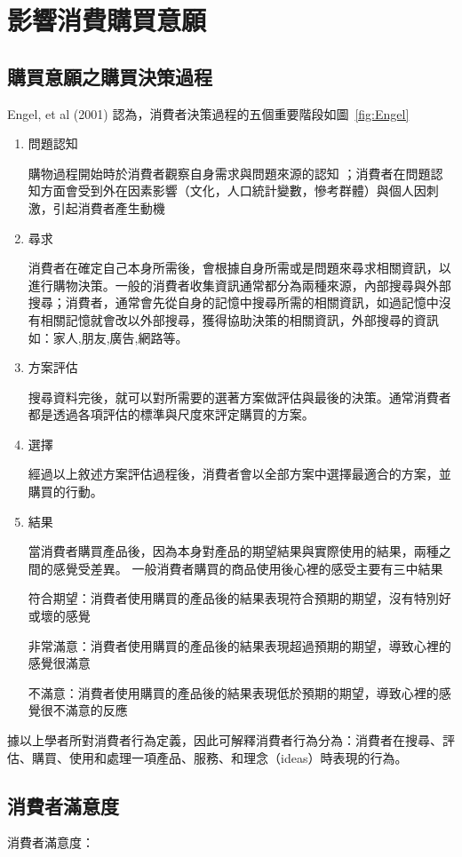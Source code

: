 \section{影響消費購買意願}
\subsection{購買意願之購買決策過程}
Engel, et al (2001) 認為，消費者決策過程的五個重要階段如圖~\ref{fig:Engel}
\begin{enumerate}
\item 問題認知

購物過程開始時於消費者觀察自身需求與問題來源的認知 ；消費者在問題認知方面會受到外在因素影響（文化，人口統計變數，慘考群體）與個人因刺激，引起消費者產生動機

\item 尋求

消費者在確定自己本身所需後，會根據自身所需或是問題來尋求相關資訊，以進行購物決策。一般的消費者收集資訊通常都分為兩種來源，內部搜尋與外部搜尋；消費者，通常會先從自身的記憶中搜尋所需的相關資訊，如過記憶中沒有相關記憶就會改以外部搜尋，獲得協助決策的相關資訊，外部搜尋的資訊如：家人,朋友,廣告,網路等。
           
\item 方案評估

搜尋資料完後，就可以對所需要的選著方案做評估與最後的決策。通常消費者都是透過各項評估的標準與尺度來評定購買的方案。

\item 選擇

經過以上敘述方案評估過程後，消費者會以全部方案中選擇最適合的方案，並購買的行動。

\item 結果 

當消費者購買產品後，因為本身對產品的期望結果與實際使用的結果，兩種之間的感覺受差異。
一般消費者購買的商品使用後心裡的感受主要有三中結果

符合期望：消費者使用購買的產品後的結果表現符合預期的期望，沒有特別好或壞的感覺

非常滿意：消費者使用購買的產品後的結果表現超過預期的期望，導致心裡的感覺很滿意

不滿意：消費者使用購買的產品後的結果表現低於預期的期望，導致心裡的感覺很不滿意的反應
\end{enumerate}

據以上學者所對消費者行為定義，因此可解釋消費者行為分為：消費者在搜尋、評估、購買、使用和處理一項產品、服務、和理念（ideas）時表現的行為。
\subsection{消費者滿意度}
消費者滿意度：

